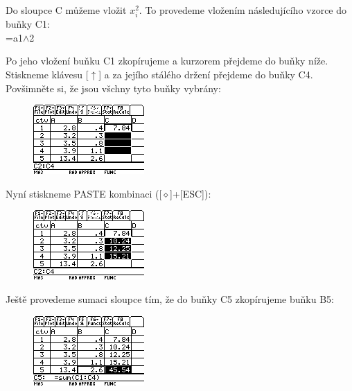 \documentclass[10pt,a4paper,float]{article}
\begin{document}
Do sloupce C můžeme vložit $x_i^2$. To provedeme vložením následujícího vzorce do buňky C1:\\
=a1$\land$2

Po jeho vložení buňku C1 zkopírujeme a kurzorem přejdeme do buňky níže. Stiskneme klávesu [$\uparrow$] a za jejího stálého držení přejdeme do buňky C4. Povšimněte si, že jsou všchny tyto buňky vybrány:

\begin{figure}[H]
	\centering
	\includegraphics[width=.5\textwidth]{img/CTVERCE4.PNG}
\end{figure}

\pagebreak

Nyní stiskneme PASTE kombinaci ([$\diamond$]+[ESC]):

\begin{figure}[H]
	\centering
	\includegraphics[width=.5\textwidth]{img/CTVERCE5.PNG}
\end{figure}

Ještě provedeme sumaci sloupce tím, že do buňky C5 zkopírujeme buňku B5:

\begin{figure}[H]
	\centering
	\includegraphics[width=.5\textwidth]{img/CTVERCE6.PNG}
\end{figure}
\end{document}

